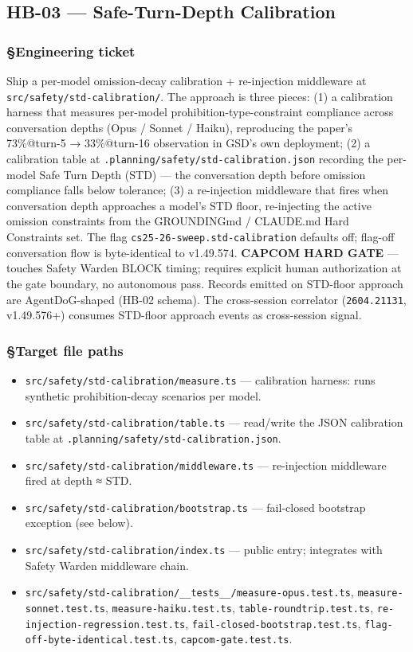 \documentclass[11pt,letterpaper]{article}
\newcommand{\arxivid}[1]{\texttt{\textcolor{accent}{#1}}}
\providecommand{\tightlist}{\setlength{\itemsep}{0pt}\setlength{\parskip}{0pt}}
\begin{document}
\subsection{HB-03 — Safe-Turn-Depth Calibration}
\subsubsection{§Engineering ticket}

Ship a per-model omission-decay calibration + re-injection middleware at
\texttt{src/safety/std-calibration/}. The approach is three pieces: (1)
a calibration harness that measures per-model
prohibition-type-constraint compliance across conversation depths (Opus
/ Sonnet / Haiku), reproducing the paper's 73\%@turn-5 → 33\%@turn-16
observation in GSD's own deployment; (2) a calibration table at
\texttt{.planning/safety/std-calibration.json} recording the per-model
Safe Turn Depth (STD) --- the conversation depth before omission
compliance falls below tolerance; (3) a re-injection middleware that
fires when conversation depth approaches a model's STD floor,
re-injecting the active omission constraints from the GROUNDINGmd /
CLAUDE.md Hard Constraints set. The flag
\texttt{cs25-26-sweep.std-calibration} defaults off; flag-off
conversation flow is byte-identical to v1.49.574. \textbf{CAPCOM HARD
GATE} --- touches Safety Warden BLOCK timing; requires explicit human
authorization at the gate boundary, no autonomous pass. Records emitted
on STD-floor approach are AgentDoG-shaped (HB-02 schema). The
cross-session correlator (\arxivid{2604.21131}, v1.49.576+) consumes
STD-floor approach events as cross-session signal.

\subsubsection{§Target file paths}

\begin{itemize}
\tightlist
\item
  \texttt{src/safety/std-calibration/measure.ts} --- calibration
  harness: runs synthetic prohibition-decay scenarios per model.
\item
  \texttt{src/safety/std-calibration/table.ts} --- read/write the JSON
  calibration table at \texttt{.planning/safety/std-calibration.json}.
\item
  \texttt{src/safety/std-calibration/middleware.ts} --- re-injection
  middleware fired at depth ≈ STD.
\item
  \texttt{src/safety/std-calibration/bootstrap.ts} --- fail-closed
  bootstrap exception (see below).
\item
  \texttt{src/safety/std-calibration/index.ts} --- public entry;
  integrates with Safety Warden middleware chain.
\item
  \texttt{src/safety/std-calibration/\_\_tests\_\_/measure-opus.test.ts},
  \texttt{measure-sonnet.test.ts}, \texttt{measure-haiku.test.ts},
  \texttt{table-roundtrip.test.ts},
  \texttt{re-injection-regression.test.ts},
  \texttt{fail-closed-bootstrap.test.ts},
  \texttt{flag-off-byte-identical.test.ts},
  \texttt{capcom-gate.test.ts}.
\end{itemize}
\end{document}
